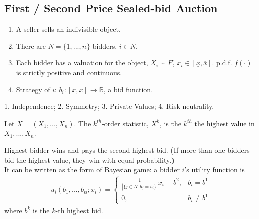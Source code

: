 \documentclass[11pt]{elegantbook_2}
\begin{document}
\subsection{First / Second Price Sealed-bid Auction}
\begin{enumerate}[$\circ$]
    \item A seller sells an indivisible object.
    \item There are $N=\{1,...,n\}$ bidders, $i\in N$.
    \item Each bidder has a valuation for the object, $X_i\sim F$, $x_i\in[\underline{x},\overline{x}]$. p.d.f. $f(\cdot)$ is strictly positive and continuous.
    \item Strategy of $i$: $b_i:[\underline{x},\overline{x}] \rightarrow \mathbb{R}$, a \underline{bid function}.
\end{enumerate}

\begin{assumption}
    1. Independence; 2. Symmetry; 3. Private Values; 4. Risk-neutrality.
\end{assumption}

Let $X=(X_1,...,X_n)$. The $k^{th}$-order statistic, $X^k$, is the $k^{th}$ the highest value in $X_1,...,X_n$.

\begin{definition}
    Highest bidder wins and pays the second-highest bid. (If more than one bidders bid the highest value, they win with equal probability.)\\
    It can be written as the form of Bayesian game: a bidder $i$'s utility function is
    \begin{equation}
        \begin{aligned}
            u_i(b_1,...,b_n;x_i)=\left\{\begin{matrix}
                \frac{1}{|\{j\in N:b_j=b_i\}|}x_i-b^2,&b_i=b^1\\
                0,&b_i\neq b^1
            \end{matrix}\right.
        \end{aligned}
        \nonumber
    \end{equation}
    where $b^k$ is the $k$-th highest bid.
\end{definition}
\end{document}
